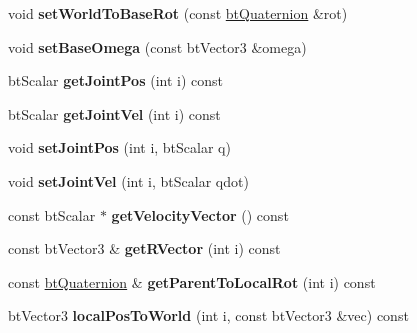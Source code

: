 \begin{DoxyCompactItemize}
\item 
\mbox{\label{classbtMultiBody_aea1adaa2e8f6bf164abe19275427dcea}} 
void {\bfseries set\+World\+To\+Base\+Rot} (const \hyperlink{classbtQuaternion}{bt\+Quaternion} \&rot)
\item 
\mbox{\label{classbtMultiBody_a56c0cf6a7bfccf1d3512933955d5127f}} 
void {\bfseries set\+Base\+Omega} (const bt\+Vector3 \&omega)
\item 
\mbox{\label{classbtMultiBody_a3aeea8cbd49121e61ee785aad78e3665}} 
bt\+Scalar {\bfseries get\+Joint\+Pos} (int i) const
\item 
\mbox{\label{classbtMultiBody_aebc99e02b1e126ecc8085b7b4965c489}} 
bt\+Scalar {\bfseries get\+Joint\+Vel} (int i) const
\item 
\mbox{\label{classbtMultiBody_aad8bd57ac6615edfc1a50502d9cb78c2}} 
void {\bfseries set\+Joint\+Pos} (int i, bt\+Scalar q)
\item 
\mbox{\label{classbtMultiBody_a8c16a6fdd585bfb3759757f4fe80f16a}} 
void {\bfseries set\+Joint\+Vel} (int i, bt\+Scalar qdot)
\item 
\mbox{\label{classbtMultiBody_abc072b33c2616cb5b61345a4f0cf0b44}} 
const bt\+Scalar $\ast$ {\bfseries get\+Velocity\+Vector} () const
\item 
\mbox{\label{classbtMultiBody_a46cab9e9195096c906e8425c3416e5ce}} 
const bt\+Vector3 \& {\bfseries get\+R\+Vector} (int i) const
\item 
\mbox{\label{classbtMultiBody_adf280476ed95d08b45cfc3745b56ac05}} 
const \hyperlink{classbtQuaternion}{bt\+Quaternion} \& {\bfseries get\+Parent\+To\+Local\+Rot} (int i) const
\item 
\mbox{\label{classbtMultiBody_a3679bf96983455fe706670d6c57b013a}} 
bt\+Vector3 {\bfseries local\+Pos\+To\+World} (int i, const bt\+Vector3 \&vec) const
\item 
\mbox{\label{classbtMultiBody_abac00bae508109a169beb605de462012}} 

\end{DoxyCompactItemize}
